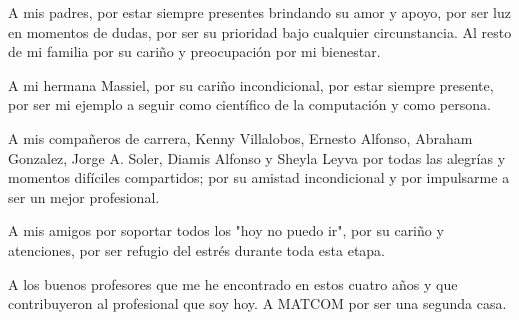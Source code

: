 \begin{acknowledgements}
A mis padres, por estar siempre presentes brindando su amor y apoyo, por ser luz 
en momentos de dudas, por ser su prioridad bajo cualquier circunstancia. Al resto de mi 
familia por su cariño y preocupaci\'on por mi bienestar. 

A mi hermana Massiel, por su cariño incondicional, por estar siempre presente, 
por ser mi ejemplo a seguir como cient\'ifico de la computaci\'on y como persona. 

A mis compañeros de carrera, Kenny Villalobos, Ernesto Alfonso, Abraham Gonzalez, Jorge A. Soler, Diamis Alfonso 
y Sheyla Leyva por todas las alegr\'ias y momentos difíciles compartidos; por su amistad incondicional y por 
impulsarme a ser un mejor profesional.

A mis amigos por soportar todos los "hoy no puedo ir", por su cariño y atenciones, por ser refugio del 
estrés durante toda esta etapa.

A los buenos profesores que me he encontrado en estos cuatro años y que contribuyeron al profesional que soy hoy. 
A MATCOM por ser una segunda casa.
\end{acknowledgements}
